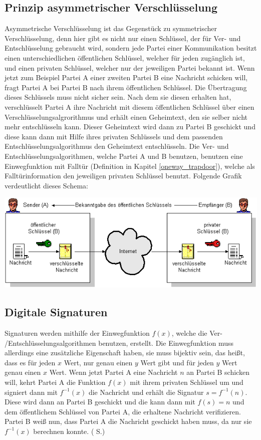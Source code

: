 \documentclass[a4paper,12pt,titlepage]{article}
\begin{document}
\subsection{Prinzip asymmetrischer Verschlüsselung}\label{asymm:prinzip}
Asymmetrische Verschlüsselung ist das Gegenstück zu symmetrischer Verschlüsselung, denn hier gibt es nicht nur einen Schlüssel, der für Ver- und Entschlüsselung gebraucht wird, sondern jede Partei einer Kommunikation besitzt einen unterschiedlichen öffentlichen Schlüssel, welcher für jeden zugänglich ist, und einen privaten Schlüssel, welcher nur der jeweiligen Partei bekannt ist. Wenn jetzt zum Beispiel Partei A einer zweiten Partei B eine Nachricht schicken will, fragt Partei A bei Partei B nach ihrem öffentlichen Schlüssel. Die Übertragung dieses Schlüssels muss nicht sicher sein. Nach dem sie diesen erhalten hat, verschlüsselt Partei A ihre Nachricht mit diesem öffentlichen Schlüssel über einen Verschlüsselungsalgrorithmus und erhält einen Geheimtext, den sie selber nicht mehr entschlüsseln kann. Dieser Geheimtext wird dann zu Partei B geschickt und diese kann dann mit Hilfe ihres privaten Schlüssels und dem passenden Entschlüsselungsalgorithmus den Geheimtext entschlüsseln. Die Ver- und Entschlüsselungsalgorithmen, welche Partei A und B benutzen, benutzen eine Einwegfunktion mit Falltür (Definition in Kapitel \ref{oneway_trapdoor}), welche als Falltürinformation den jeweiligen privaten Schlüssel benutzt. \newline Folgende Grafik verdeutlicht dieses Schema:
\begin{center}
\includegraphics[scale=0.7]{asymm_shema.png} %
\end{center}
\subsection{Digitale Signaturen}\label{asymm:sign}
Signaturen werden mithilfe der Einwegfunktion $f(x)$, welche die Ver- /Entschlüsselungsalgorithmen benutzen, erstellt. Die Einwegfunktion muss allerdings eine zusätzliche Eigenschaft haben, sie muss bijektiv sein, das heißt, dass es für jeden $x$ Wert, nur genau einen $y$ Wert gibt und für jeden $y$ Wert genau einen $x$ Wert.
Wenn jetzt Partei A eine Nachricht $n$ an Partei B schicken will, kehrt Partei A die Funktion $f(x)$ mit ihrem privaten Schlüssel um und signiert dann mit $f^{-1}(x)$ die Nachricht und erhält die Signatur $s = f^{-1}(n)$. Diese wird dann an Partei B geschickt und die kann dann mit $f(s) = n$ und dem öffentlichem Schlüssel von Partei A, die erhaltene Nachricht verifizieren. Partei B weiß nun, dass Partei A die Nachricht geschickt haben muss, da nur sie $f^{-1}(x)$ berechnen konnte. (\cite{delfs_knebl} S.)
\end{document}
